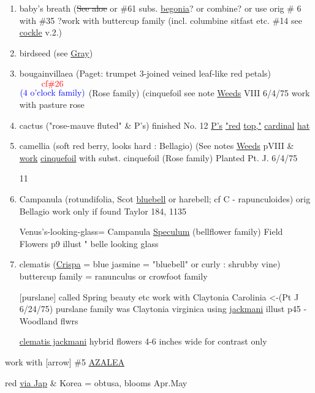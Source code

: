 \documentclass[a4paper,9pt]{article}
\begin{document}
\begin{enumerate}
\color{black}
\item baby's breath 
\color{red}
(\sout{See aloe}
or \#61
subs. \ul{begonia}? or combine? or use orig \# 6 with \#35
\color{black}
?work with buttercup family 
(incl. columbine 
sitfast etc. 
\color{red}\#14
\color{black}
see \ul{cockle} v.2.)
\item birdseed (see \ul{Gray})


\item bougainvillaea (Paget: trumpet 3-joined
veined leaf-like red petals) {$\stackrel{\hbox{\color{red}{cf\#26}}}{\hbox{\color{blue}{(4 o'clock family)}}}$}
\color{red}
(Rose family) (cinquefoil see note \ul{Weeds} VIII 6/4/75 work with 
pasture rose
\color{black}
\item cactus ("rose-mauve fluted" \& P's)
\color{blue}
finished 
No. 12
\ul{P's} \ul{"red} \ul{top,"} \ul{cardinal} \ul{hat}
\color{black}
\item camellia (soft red berry, looks hard : Bellagio)
(See notes \ul{Weeds} 
pVIII \& \ul{work} \ul{cinquefoil} with %
subst. cinquefoil (Rose family) Planted Pt. J. 6/4/75

\color{blue}11
\color{black}
\item Campanula (rotundifolia, Scot \ul{bluebell}
 or harebell; cf C - rapunculoides)
\color{red}
orig 
Bellagio
work only if found
\color{blue}
Taylor
184, 1135 

Venus's-looking-glass= Campanula \ul{Speculum} (bellflower family)
\color{red}
Field Flowers p9 illust " belle looking glass
\color{black}
\item clematis (\ul{Crispa} \color{blue}= \color{black} blue jasmine \color{blue}= \color{black} "bluebell"
or curly : shrubby vine)
\color{blue}
buttercup 
family \color{red}= ranunculus or crowfoot family

[purslane]
\color{red}
called Spring 
beauty etc
work with Claytonia Carolinia <-(Pt J 6/24/75)
\tiny
\color{blue}purslane family
\normalsize
\color{red}
was Claytonia virginica using \ul{jackmani}
illust p45 - Woodland flwrs

\ul{clematis jackmani}
hybrid flowers
4-6 inches wide
for contrast only
\end{enumerate}


\color{red}
work with [arrow]
\#5 
\ul{AZALEA}

red \ul{via Jap} \color{blue} \& Korea 
\color{red}= obtusa,
blooms Apr.May
\end{document}
